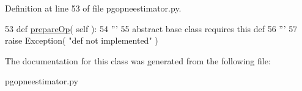 Definition at line 53 of file pgopneestimator.\+py.


\begin{DoxyCode}
53     \textcolor{keyword}{def }\hyperlink{classnegui_1_1pgopneestimator_1_1PGOpNeEstimator_a37628c8a837a75a542ae82947dc367fd}{prepareOp}( self ):
54         \textcolor{stringliteral}{'''}
55 \textcolor{stringliteral}{        abstract base class requires this def}
56 \textcolor{stringliteral}{        '''}
57         \textcolor{keywordflow}{raise} Exception( \textcolor{stringliteral}{"def not implemented"} )
\end{DoxyCode}


The documentation for this class was generated from the following file\+:\begin{DoxyCompactItemize}
\item 
pgopneestimator.\+py\end{DoxyCompactItemize}
